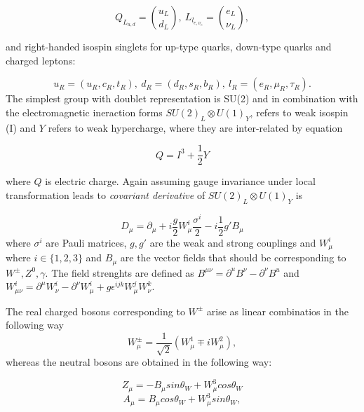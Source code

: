 \begin{equation}
Q_{L_{u,d}} = \binom{u_{L}}{d_{L}},~L_{l_{e,\nu_{e}}} = \binom{e_{L}}{\nu_{L}},
\end{equation}

and right-handed isospin singlets for up-type quarks, down-type quarks and charged leptons:

\begin{equation}
	u_{R}=(u_{R},c_{R},t_{R}),~
	d_{R}=(d_{R},s_{R},b_{R}),~
	l_{R}=(e_{R},\mu_{R},\tau_{R}).
\end{equation}
The simplest group with doublet representation is SU(2) and in combination with the electromagnetic ineraction forms $SU(2)_{L} \otimes U(1)_{Y}$, refers to weak isospin (I) and $Y$ refers to weak hypercharge, where they are inter-related by equation

\begin{equation}
Q=I^{3} + \frac{1}{2}Y
\end{equation}

where $Q$ is electric charge. Again assuming gauge invariance under local transformation leads to \textit{covariant derivative} of $SU(2)_{L}\otimes U(1)_{Y}$ is

\begin{equation}
	D_{\mu} = \partial_{\mu} + i\frac{g}{2}W_{\mu}^{i} \frac{\sigma^{i}}{2} - i \frac{1}{2}g'B_{\mu} 
\label{eq:covdev}
\end{equation}
where $\sigma^{i}$ are Pauli matrices, $g,g'$ are the weak and strong couplings and $W_{\mu}^{i}$ where $i\in\{1,2,3\}$ and $B_{\mu}$ are the vector fields that should be corresponding to $W^{\pm},Z^{0},\gamma$.
The field strenghts are defined as $B^{\mu\nu}=\partial^{u}B^{\nu} - \partial^{\nu}B^{u}$ and $W^{i}_{\mu\nu} = \partial^{\mu}W^{i}_{\nu} - \partial^{\nu}W^{i}_{\mu}+ g\epsilon^{ijk}W_{\mu}^{j}W_{\nu}^{k}$.

The real charged bosons corresponding to $W^{\pm}$ arise as linear combinatios in the following way
\begin{equation}
W^{\pm}_{\mu} = \frac{1}{\sqrt{2}}(W^{1}_{\mu}\mp iW^{2}_{\mu}),
\end{equation} 
whereas the neutral bosons are obtained in the following way:


\begin{equation}
	Z_{\mu}=-B_{\mu}sin\theta_{W}+W^{3}_{\mu}cos\theta_{W}
\end{equation}
\begin{equation}
	A_{\mu}= B_{\mu}cos\theta_{W}+W^{3}_{\mu}sin\theta_{W},
\end{equation}

